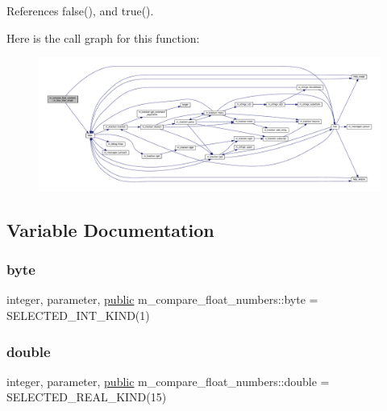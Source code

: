 References false(), and true().

Here is the call graph for this function\+:
\nopagebreak
\begin{figure}[H]
\begin{center}
\leavevmode
\includegraphics[width=350pt]{namespacem__compare__float__numbers_a82b07d4a5f9076d2dc0655c8733549b5_cgraph}
\end{center}
\end{figure}


\subsection{Variable Documentation}
\mbox{\label{namespacem__compare__float__numbers_ae232d1653572b564934db62fc9caaa93}} 
\subsubsection{\texorpdfstring{byte}{byte}}
{\footnotesize\ttfamily integer, parameter, \hyperlink{M__stopwatch_83_8txt_a2f74811300c361e53b430611a7d1769f}{public} m\+\_\+compare\+\_\+float\+\_\+numbers\+::byte = S\+E\+L\+E\+C\+T\+E\+D\+\_\+\+I\+N\+T\+\_\+\+K\+I\+ND(1)}

\mbox{\label{namespacem__compare__float__numbers_af4b789cd6e1a2abcd412eaf29e91ea0c}} 
\subsubsection{\texorpdfstring{double}{double}}
{\footnotesize\ttfamily integer, parameter, \hyperlink{M__stopwatch_83_8txt_a2f74811300c361e53b430611a7d1769f}{public} m\+\_\+compare\+\_\+float\+\_\+numbers\+::double = S\+E\+L\+E\+C\+T\+E\+D\+\_\+\+R\+E\+A\+L\+\_\+\+K\+I\+ND(15)}

